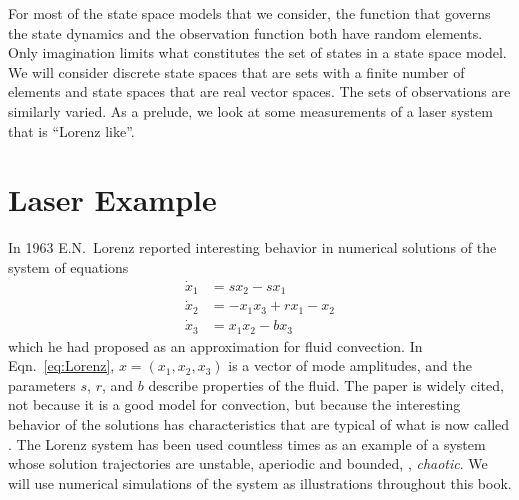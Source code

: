 For most of the state space models that we consider, the function that
governs the state dynamics and the observation function both have
random elements.  Only imagination limits what constitutes the set of
states in a state space model.  We will consider discrete state spaces
that are sets with a finite number of elements and state spaces that
are real vector spaces.  The sets of observations are similarly
varied.  As a prelude, we look at some measurements of a laser system
that is ``Lorenz like''.

\section{Laser Example}
\label{sec:laser}

In 1963 E.N.~Lorenz\cite{Lorenz63} %
%
reported interesting behavior in numerical solutions of the system of
equations
\begin{subequations}
  \label{eq:Lorenz}
  \begin{align}
    \dot x_1 &= s x_2 -s x_1\\
    \dot x_2 &= -x_1 x_3 + r x_1 - x_2 \\
    \dot x_3 &= x_1 x_2 - b x_3
  \end{align}
\end{subequations}
which he had proposed as an approximation for fluid convection.  In
Eqn.~\eqref{eq:Lorenz}, $x = (x_1,x_2,x_3)$ is a vector of mode
amplitudes, and the parameters $s$, $r$, and $b$ describe properties
of the fluid.  The paper is widely cited, not because it is a good
model for convection, but because the interesting behavior of the
solutions has characteristics that are typical of what is now called
\emph{}.  The Lorenz system has been used countless
times as an example of a system whose solution trajectories are
unstable, aperiodic and bounded, \ie, \emph{chaotic}.  We will use
numerical simulations of the system as illustrations throughout this
book.

